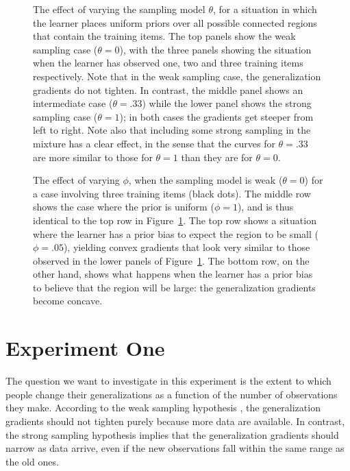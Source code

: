 \documentclass[doc]{apa6}
\begin{document}
\begin{figure}
\begin{center}
\caption{The effect of varying the sampling model $\theta$, for a situation in which the learner places uniform priors over all possible connected regions that contain the training items. The top panels show the weak sampling case ($\theta=0$), with the three panels showing the situation when the learner has observed one, two and three training items respectively. Note that in the weak sampling case, the generalization gradients do not tighten. In contrast, the middle panel shows an intermediate case ($\theta=.33$) while the lower panel shows the strong sampling case ($\theta=1$); in both cases the gradients get steeper from left to right. Note also that including some strong sampling in the mixture has a clear effect, in the sense that the curves for $\theta=.33$ are more similar to those for $\theta=1$ than they are for $\theta=0$.}
\label{varytheta}
\end{center}
\end{figure}

\begin{figure}
\begin{center}
\caption{The effect of varying $\phi$, when the sampling model is weak ($\theta=0$) for a case involving three training items (black dots). The middle row shows the case where the prior is uniform ($\phi=1$), and is thus identical to the top row in Figure~\protect\ref{varytheta}. The top row shows a situation where the learner has a prior bias to expect the region to be small ($\phi=.05$), yielding convex gradients that look very similar to those observed in the lower panels of  Figure~\protect\ref{varytheta}. The bottom row, on the other hand, shows what happens when the learner has a prior bias to believe that the region will be large: the generalization gradients become concave.}
\label{varyphiweak}
\end{center}
\end{figure}

\section{Experiment One}

The question we want to investigate in this experiment is the extent to which people change their generalizations as a function of the number of observations they make. According to the weak sampling hypothesis \cite<as per>{Shepard1987,Heit1998,Kemp2009}, the generalization gradients should not tighten purely because more data are available. In contrast, the strong sampling hypothesis \cite<as per>{Tenenbaum2001,Sanjana2003} implies that the generalization gradients should narrow as data arrive, even if the new observations fall within the same range as the old ones.
\end{document}

